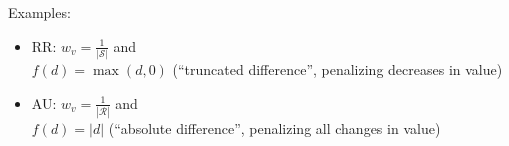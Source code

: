 Examples:
\begin{itemize}
	\item RR: $w_v = \frac{1}{|\mathcal{S}|}$ and \\
	$f(d) = \max(d,0)$ (\enquote{truncated difference}, penalizing decreases in value)
	\item AU: $w_v = \frac{1}{|\mathcal{R}|}$ and \\
	$f(d) = |d|$ (\enquote{absolute difference}, penalizing all changes in value)
\end{itemize}

\newpage






